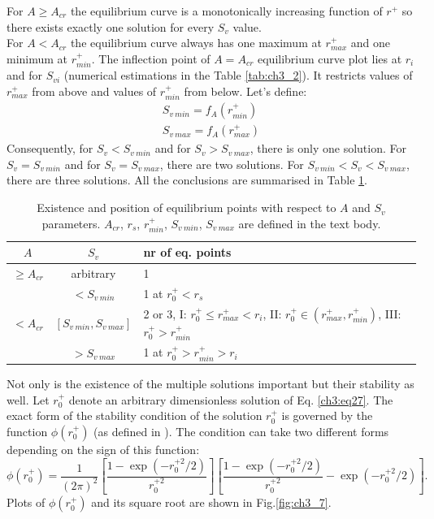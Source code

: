 \documentclass[../main.tex]{subfiles}
\begin{document}
For $A \geq A_{cr}$ the equilibrium curve is a monotonically increasing function of $r^+$ so there exists exactly one solution for every $S_v$ value.\\
For $A<A_{cr}$ the equilibrium curve always has one maximum at $r^+_{max}$ and one minimum at $r^+_{min}$. The inflection point of $A=A _{cr}$ equilibrium curve plot lies at $r_i$ and for $S_{v i}$ (numerical estimations in the Table \ref{tab:ch3_2}). It restricts values of $r^+_{max}$ from above and values of $r^+_{min}$ from below. Let's define:
\begin{align}
S_{v\ min}=f_A(r^+_{min}) \\
S_{v\ max}=f_A(r^+_{max})
\label{ch3:eq28b}
\end{align}
Consequently, for $S_v<S_{v\ min}$ and for $S_v>S_{v\ max}$, there is only one solution. For $S_v=S_{v\ min}$ and for $S_v=S_{v\ max}$, there are two solutions. For $S_{v\ min}<S_v<S_{v\ max}$, there are three solutions. All the conclusions are summarised in Table \ref{tab:ch3_2b}.

\begin{table}
\small
\tabcolsep=0.2cm
\caption{Existence and position of equilibrium points with respect to $A$ and $S_v$ parameters. $A_{cr}$, $r_s$, $r^+_{min}$, $S_{v\ min}$, $S_{v\ max}$ are defined in the text body.}
\centering
\begin{tabular}{|c|c|l|}
\hline
$A$ & $S_v$ & nr  of eq. points\\
\hline
$\geq A_{cr}$ & arbitrary & 1 \\
\hline
\multirow{3}{*}{$<A_{cr}$} & $<S_{v\ min}$ & 1 at $r^+_0 <r_s$ \\
\multirow{3}{*}{\ } & $[S_{v\ min},S_{v\ max}]$  & 2 or 3, I: $r^+_0\leq r^+_{max}<r_i$, II: $r^+_0 \in (r^+_{max},r^+_{min})$, III: $r^+_0>r^+_{min}$\\
\multirow{3}{*}{\ } & $>S_{v\ max}$  & 1 at $r^+_0>r^+_{min}>r_i$\\
\hline
\end{tabular}
\label{tab:ch3_2b}
\end{table}

Not only is the existence of the multiple solutions important but their stability as well. Let $r^+_0$ denote an arbitrary dimensionless solution of Eq. \ref{ch3:eq27}. The exact form of the stability condition of the solution $r^+_0$ is governed by the function $\phi(r^+_0)$ (as defined in \citet{Marcu1995}). The condition can take two different forms depending on the sign of this function:
\begin{equation}
\phi(r^+_0)=\frac{1}{(2 \pi)^2} \left[\frac{1-\exp(-r^{+ 2}_0/2)}{r^{+ 2}_0} \right] \left[\frac{1-\exp(-r^{+ 2}_0/2)}{r^{+ 2}_0}-\exp(-r^{+ 2}_0/2) \right].
\label{ch3:eq29}
\end{equation}
Plots of $\phi(r^+_0)$ and its square root are shown in Fig.\ref{fig:ch3_7}.
\end{document}
